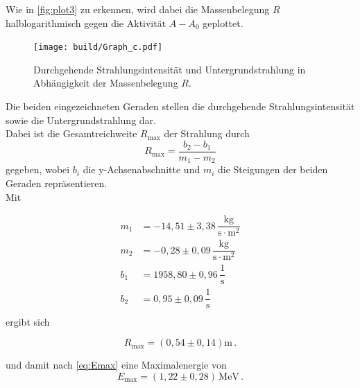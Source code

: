 Wie in \autoref{fig:plot3} zu erkennen, wird dabei die Massenbelegung $R$ halblogarithmisch gegen die Aktivität $A - A_0$ geplottet.
\begin{figure}[H]
    \centering
    \texttt{[image: build/Graph\_c.pdf]}
    \caption{Durchgehende Strahlungsintensität und Untergrundstrahlung in Abhängigkeit der Massenbelegung $R$.}
    \label{fig:plot3}
\end{figure}
Die beiden eingezeichneten Geraden stellen die durchgehende Strahlungsintensität sowie die Untergrundstrahlung dar. \\
Dabei ist die Gesamtreichweite $R_\text{max}$ der Strahlung durch
\begin{equation*}
    R_\text{max} = \frac{b_2 - b_1}{m_1 - m_2}
\end{equation*}
gegeben, wobei $b_i$ die y-Achsenabschnitte und $m_i$ die Steigungen der beiden Geraden repräsentieren. \\

Mit

\begin{align*}
    m_1 &= -14,51  \pm 3,38\,  \dfrac{\unit{\kilo\gram}}{\unit{\second \cdot \meter^2}}\\
    m_2 &= -0,28   \pm 0,09\,  \dfrac{\unit{\kilo\gram}}{\unit{\second \cdot \meter^2}}  \\
    b_1 &= 1958,80 \pm 0,96\,  \dfrac{1}{\unit{\second}}                         \\
    b_2 &= 0,95    \pm 0,09\,  \dfrac{1}{\unit{\second}}                          \\
\end{align*} ergibt sich

\begin{equation*}
    R_\text{max} = \left( 0,54 \pm 0,14 \right)  \unit{\meter} \,.
\end{equation*}

und damit nach \eqref{eq:Emax} eine Maximalenergie von
\begin{equation*}
    E_\text{max} = \left(1,22 \pm 0,28 \right) \, \unit{\mega\eV} \,.
\end{equation*}
